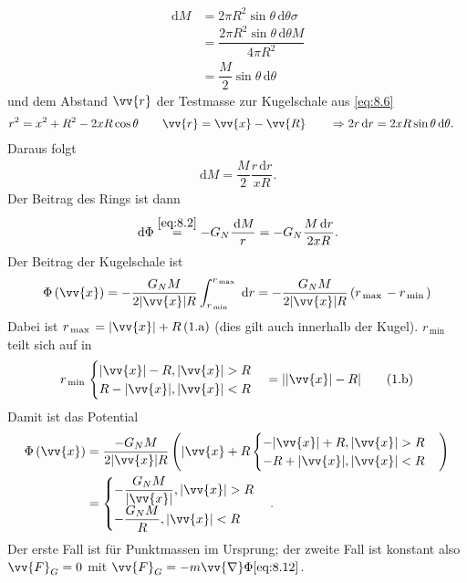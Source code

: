 \documentclass[a4paper,12pt]{article}
\newcommand{\td}{\,\text{d}}
\newcommand\inlineeqnoa{(\theequation.\text{a})}
\newcommand\inlineeqnowob{\theequation.\text{b}}
\numberwithin{equation}{section}
\begin{document}
\begin{align} 
        \td M&=2\pi R^2\sin \theta \td \theta \sigma \nonumber\\
             &=\dfrac{2\pi R^2\sin \theta \td \theta M}{4\pi R^2}\nonumber\\
             &=\dfrac{M}{2}\sin \theta \td \theta \label{eq:8.7}
\end{align} 
und dem Abstand $\vv{r}$ der Testmasse zur Kugelschale aus \eqref{eq:8.6}
\begin{align*} 
        r^2&=x^2+R^2-2xR\cos \theta \qquad \vv{r}=\vv{x}-\vv{R}\qquad \Rightarrow 2r\td r=2xR\sin \theta \td \theta 
.\end{align*} 
Daraus folgt
\begin{align} 
        \td M=\dfrac{M}{2}\dfrac{r\td r}{xR}\label{eq:8.8}
.\end{align} 
Der Beitrag des Rings ist dann
\begin{align} 
        \td \Phi \stackrel{\eqref{eq:8.2}}{=}-G_N\dfrac{\td M}{r}=-G_N\dfrac{M\td r}{2xR}\label{eq:8.9}
.\end{align} 
Der Beitrag der Kugelschale ist
\begin{align} 
        \Phi \left(\vv{x}\right)=-\dfrac{G_NM}{2|\vv{x}|R}\int_{r_{\,\text{min}\,}}^{r_{\,\text{max}\,}}\td r=-\dfrac{G_NM}{2|\vv{x}|R}\left(r_{\,\text{max}\,}-r_{\,\text{min}\,}\right)\label{eq:8.10}
\end{align} 
Dabei ist $r_{\,\text{max}\,}=|\vv{x}|+R\,\stepcounter{equation}\inlineeqnoa\label{eq:8.10.a}$
(dies gilt auch innerhalb der Kugel). $r_{\,\text{min}\,}$ teilt sich auf in 
\begin{align*} 
        r_{\,\text{min}\,}\begin{cases}
              |\vv{x}|-R,|\vv{x}|>R\\
              R-|\vv{x}|,|\vv{x}|<R
      \end{cases}=||\vv{x}|-R|\tag{\inlineeqnowob}\label{8.11.b}
\end{align*} 
Damit ist das Potential 
\begin{align} 
        \Phi \left(\vv{x}\right)&=\dfrac{-G_NM}{2|\vv{x}|R}\left(|\vv{x}+R\begin{cases}
                -|\vv{x}|+R,|\vv{x}|>R\\
                -R+|\vv{x}|,|\vv{x}|<R
        \end{cases}\right)\nonumber \\
                                &=\begin{cases}
                                        -\dfrac{G_NM}{|\vv{x}|},|\vv{x}|>R\\
                                        -\dfrac{G_NM}{R},|\vv{x}|<R
                                \end{cases}\label{eq:8.12}
.\end{align} 
Der erste Fall ist für Punktmassen im Ursprung; der zweite Fall ist konstant also $\vv{F}_G=0$ mit $\vv{F}_G=-m\vv{\nabla }\Phi \eqref{eq:8.12}$.\\\indent
\end{document}

